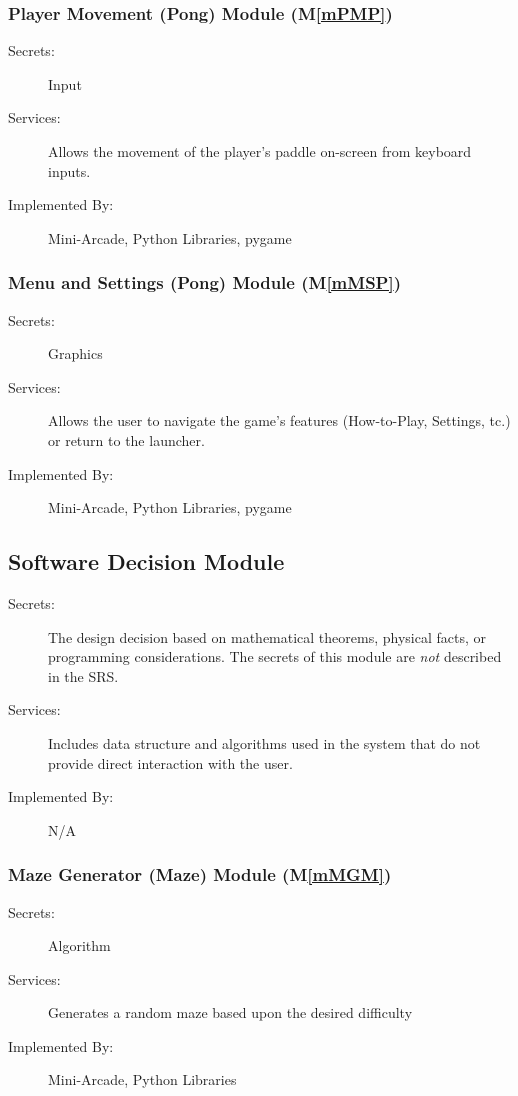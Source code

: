 \documentclass[12pt, titlepage]{article}
\newcommand{\mref}[1]{M\ref{#1}}
\begin{document}
\subsubsection{Player Movement (Pong) Module (\mref{mPMP})}
\begin{description}
\item[Secrets:] Input
\item[Services:] Allows the movement of the player's paddle on-screen from keyboard inputs.
\item[Implemented By:] Mini-Arcade, Python Libraries, pygame
\end{description}

\subsubsection{Menu and Settings (Pong) Module (\mref{mMSP})}
\begin{description}
\item[Secrets:] Graphics
\item[Services:] Allows the user to navigate the game's features (How-to-Play, Settings, tc.) or return to the launcher.
\item[Implemented By:] Mini-Arcade, Python Libraries, pygame
\end{description}



\subsection{Software Decision Module}

\begin{description}
\item[Secrets:] The design decision based on mathematical theorems, physical
  facts, or programming considerations. The secrets of this module are
  \emph{not} described in the SRS.
\item[Services:] Includes data structure and algorithms used in the system that
  do not provide direct interaction with the user. 
\item[Implemented By:] N/A
\end{description}

\subsubsection{Maze Generator (Maze) Module (\mref{mMGM})}
\begin{description}
\item[Secrets:] Algorithm
\item[Services:] Generates a random maze based upon the desired difficulty 
\item[Implemented By:] Mini-Arcade, Python Libraries
\end{description}
\end{document}
